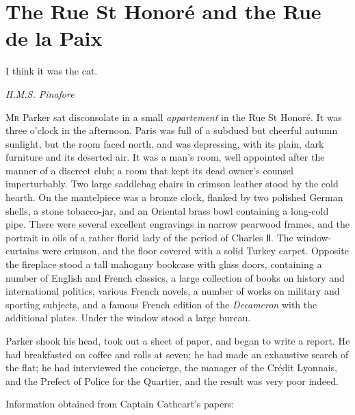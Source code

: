 \chapter{The Rue St Honoré and the Rue de la Paix}

\epigraph{I think it was the cat.}{\textit{H.M.S. Pinafore}}



\lettrine[lines=4]{M}{r} Parker sat disconsolate in a small \foreignlanguage{french}{\textit{appartement}} in the Rue St  Honoré. It was three o'clock in the afternoon. Paris was full of a subdued but cheerful autumn sunlight, but the room faced north, and was depressing, with its plain, dark furniture and its deserted air.  It was a man's room, well appointed after the manner of a discreet club; a room that kept its dead owner's counsel imperturbably. Two large saddlebag chairs in crimson leather stood by the cold hearth.  On the mantelpiece was a bronze clock, flanked by two polished German shells, a stone tobacco-jar, and an Oriental brass bowl containing a long-cold pipe. There were several excellent engravings in narrow pearwood frames, and the portrait in oils of a rather florid lady of the period of Charles Ⅱ. The window-curtains were crimson, and the floor covered with a solid Turkey carpet. Opposite the fireplace stood a tall mahogany bookcase with glass doors, containing a number of English and French classics, a large collection of books on history and international politics, various French novels, a number of works on military and sporting subjects, and a famous French edition of the \textit{Decameron} with the additional plates. Under the window stood a large bureau.

Parker shook his head, took out a sheet of paper, and began to write a report. He had breakfasted on coffee and rolls at seven; he had made an exhaustive search of the flat; he had interviewed the concierge, the manager of the Crédit Lyonnais, and the Prefect of Police for the Quartier, and the result was very poor indeed.

Information obtained from Captain Cathcart's papers:

